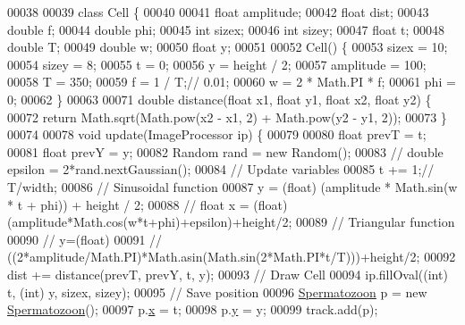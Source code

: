 \begin{DoxyCode}
00038 
00039   \textcolor{keyword}{class }Cell \{
00040 
00041     \textcolor{keywordtype}{float}  amplitude;
00042     \textcolor{keywordtype}{float}  dist;
00043     \textcolor{keywordtype}{double} f;
00044     \textcolor{keywordtype}{double} phi;
00045     \textcolor{keywordtype}{int}    sizex;
00046     \textcolor{keywordtype}{int}    sizey;
00047     \textcolor{keywordtype}{float}  t;
00048     \textcolor{keywordtype}{double} T;
00049     \textcolor{keywordtype}{double} w;
00050     \textcolor{keywordtype}{float}  y;
00051 
00052     Cell() \{
00053       sizex = 10;
00054       sizey = 8;
00055       t = 0;
00056       y = height / 2;
00057       amplitude = 100;
00058       T = 350;
00059       f = 1 / T;\textcolor{comment}{// 0.01;}
00060       w = 2 * Math.PI * f;
00061       phi = 0;
00062     \}
00063 
00071     \textcolor{keywordtype}{double} distance(\textcolor{keywordtype}{float} x1, \textcolor{keywordtype}{float} y1, \textcolor{keywordtype}{float} x2, \textcolor{keywordtype}{float} y2) \{
00072       \textcolor{keywordflow}{return} Math.sqrt(Math.pow(x2 - x1, 2) + Math.pow(y2 - y1, 2));
00073     \}
00074 
00078     \textcolor{keywordtype}{void} update(ImageProcessor ip) \{
00079 
00080       \textcolor{keywordtype}{float} prevT = t;
00081       \textcolor{keywordtype}{float} prevY = y;
00082       Random rand = \textcolor{keyword}{new} Random();
00083       \textcolor{comment}{// double epsilon = 2*rand.nextGaussian();}
00084       \textcolor{comment}{// Update variables}
00085       t += 1;\textcolor{comment}{// T/width;}
00086       \textcolor{comment}{// Sinusoidal function}
00087       y = (float) (amplitude * Math.sin(w * t + phi)) + height / 2;
00088       \textcolor{comment}{// float x = (float) (amplitude*Math.cos(w*t+phi)+epsilon)+height/2;}
00089       \textcolor{comment}{// Triangular function}
00090       \textcolor{comment}{// y=(float)}
00091       \textcolor{comment}{// ((2*amplitude/Math.PI)*Math.asin(Math.sin(2*Math.PI*t/T)))+height/2;}
00092       dist += distance(prevT, prevY, t, y);
00093       \textcolor{comment}{// Draw Cell}
00094       ip.fillOval((\textcolor{keywordtype}{int}) t, (\textcolor{keywordtype}{int}) y, sizex, sizey);
00095       \textcolor{comment}{// Save position}
00096       \hyperlink{classdata_1_1_spermatozoon}{Spermatozoon} p = \textcolor{keyword}{new} \hyperlink{classdata_1_1_spermatozoon}{Spermatozoon}();
00097       p.\hyperlink{classdata_1_1_spermatozoon_ad0da36b2558901e21e7a30f6c227a45e}{x} = t;
00098       p.\hyperlink{classdata_1_1_spermatozoon_aa4f0d3eebc3c443f9be81bf48561a217}{y} = y;
00099       track.add(p);

\end{DoxyCode}
